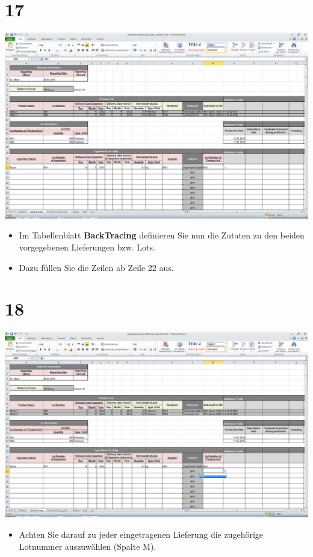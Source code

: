 \documentclass{beamer}
\begin{document}
\section{17}
\begin{frame}
	\begin{center}
  		\includegraphics[height=0.6\textheight]{17.png}
	\end{center}
	\begin{itemize}
		\item Im Tabellenblatt \textbf{BackTracing} definieren Sie nun die Zutaten zu den beiden vorgegebenen Lieferungen bzw. Lots.
		\item Dazu füllen Sie die Zeilen ab Zeile 22 aus.
	\end{itemize}
\end{frame}

\section{18}
\begin{frame}
	\begin{center}
  		\includegraphics[height=0.6\textheight]{18.png}
	\end{center}
	\begin{itemize}
		\item Achten Sie darauf zu jeder eingetragenen Lieferung die zugehörige Lotnummer auszuwählen (Spalte M).
	\end{itemize}
\end{frame}
\end{document}
